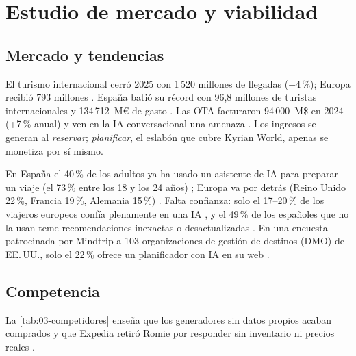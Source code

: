 \section{Estudio de mercado y viabilidad}\label{sec:03-mercado}

\subsection{Mercado y tendencias}

El turismo internacional cerró 2025 con 1\,520 millones de llegadas (+4\,\%); Europa recibió
793 millones \cite{mk:untourism2025}.
España batió su récord con 96,8 millones de turistas internacionales y 134\,712~M€ de gasto
\cite{mk:egatur2025}. Las OTA facturaron 94\,000~M\$ en 2024 (+7\,\% anual) y ven
en la IA conversacional una amenaza \cite{mk:skiftota}. Los ingresos se generan al \emph{reservar};
\emph{planificar}, el eslabón que cubre Kyrian World, apenas se monetiza por sí mismo.

En España el 40\,\% de los adultos ya ha usado un asistente de IA para preparar un viaje (el
73\,\% entre los 18 y los 24 años) \cite{mk:yougov2026}; Europa va por detrás (Reino Unido
22\,\%, Francia 19\,\%, Alemania 15\,\%) \cite{mk:phocuseurope2025}. Falta confianza: solo el 17--20\,\% de los viajeros europeos confía plenamente en una IA
\cite{mk:phocustrust}, y el 49\,\% de los españoles que no la usan teme recomendaciones
inexactas o desactualizadas \cite{mk:yougov2026}. En una encuesta patrocinada por Mindtrip a
103 organizaciones de gestión de destinos (DMO) de EE.\,UU., solo el 22\,\% ofrece un
planificador con IA en su web \cite{mk:dmoreadiness}.

\subsection{Competencia}

La \cref{tab:03-competidores} enseña que los generadores sin datos propios acaban comprados y
que Expedia retiró Romie por responder sin inventario ni precios reales \cite{mk:romie}.

